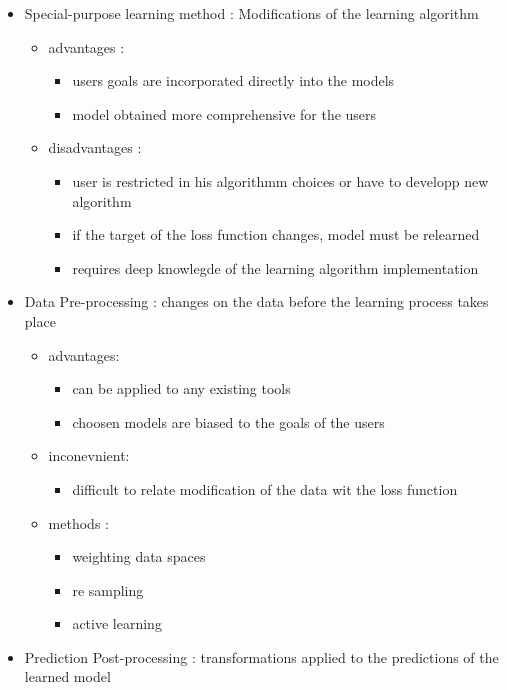 \documentclass[
]{report}
\providecommand{\tightlist}{%
  \setlength{\itemsep}{0pt}\setlength{\parskip}{0pt}}
\begin{document}
\begin{itemize}
\tightlist
\item
  Special-purpose learning method : Modifications of the learning algorithm

  \begin{itemize}
  \tightlist
  \item
    advantages :

    \begin{itemize}
    \tightlist
    \item
      users goals are incorporated directly into the models
    \item
      model obtained more comprehensive for the users
    \end{itemize}
  \item
    disadvantages :

    \begin{itemize}
    \tightlist
    \item
      user is restricted in his algorithmm choices or have to developp new algorithm
    \item
      if the target of the loss function changes, model must be relearned
    \item
      requires deep knowlegde of the learning algorithm implementation
    \end{itemize}
  \end{itemize}
\item
  Data Pre-processing : changes on the data before the learning process takes place

  \begin{itemize}
  \tightlist
  \item
    advantages:

    \begin{itemize}
    \tightlist
    \item
      can be applied to any existing tools
    \item
      choosen models are biased to the goals of the users
    \end{itemize}
  \item
    inconevnient:

    \begin{itemize}
    \tightlist
    \item
      difficult to relate modification of the data wit the loss function
    \end{itemize}
  \item
    methods :

    \begin{itemize}
    \tightlist
    \item
      weighting data spaces
    \item
      re sampling
    \item
      active learning
    \end{itemize}
  \end{itemize}
\item
  Prediction Post-processing : transformations applied to the predictions of the learned model


\end{itemize}
\end{document}
